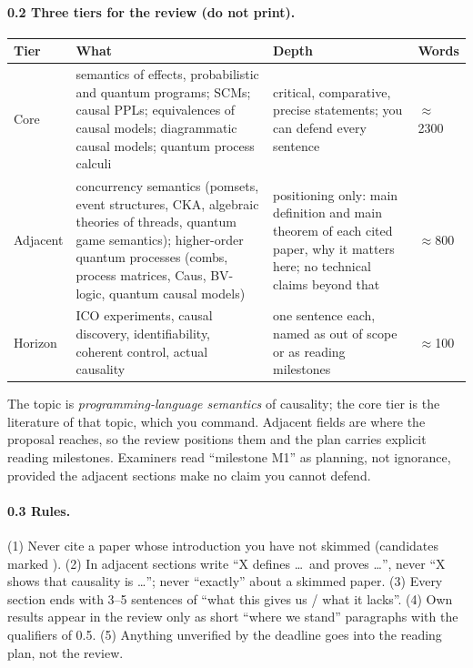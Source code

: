 \documentclass[11pt,a4paper]{article}
\newif\ifskeletonnotes
\newcommand{\skim}{\ifskeletonnotes{\color{purple!70!black}[SKIM]}\fi}
\begin{document}
\paragraph{0.2 Three tiers for the review (do not print).}
\begin{center}\small
\begin{tabularx}{\textwidth}{lXXl}
\toprule
Tier & What & Depth & Words\\
\midrule
Core & semantics of effects, probabilistic and quantum programs; SCMs; causal PPLs; equivalences of causal models; diagrammatic causal models; quantum process calculi & critical, comparative, precise statements; you can defend every sentence & $\approx$2300\\
Adjacent & concurrency semantics (pomsets, event structures, CKA, algebraic theories of threads, quantum game semantics); higher-order quantum processes (combs, process matrices, Caus, BV-logic, quantum causal models) & positioning only: main definition and main theorem of each cited paper, why it matters here; no technical claims beyond that & $\approx$800\\
Horizon & ICO experiments, causal discovery, identifiability, coherent control, actual causality & one sentence each, named as out of scope or as reading milestones & $\approx$100\\
\bottomrule
\end{tabularx}
\end{center}
The topic is \emph{programming-language semantics} of causality; the core tier is the literature of that topic, which you command. Adjacent fields are where the proposal reaches, so the review positions them and the plan carries explicit reading milestones. Examiners read ``milestone M1'' as planning, not ignorance, provided the adjacent sections make no claim you cannot defend.

\paragraph{0.3 Rules.} (1) Never cite a paper whose introduction you have not skimmed (candidates marked \skim). (2) In adjacent sections write ``X defines \dots\ and proves \dots'', never ``X shows that causality is \dots''; never ``exactly'' about a skimmed paper. (3) Every section ends with 3--5 sentences of ``what this gives us / what it lacks''. (4) Own results appear in the review only as short ``where we stand'' paragraphs with the qualifiers of 0.5. (5) Anything unverified by the deadline goes into the reading plan, not the review.
\end{document}
